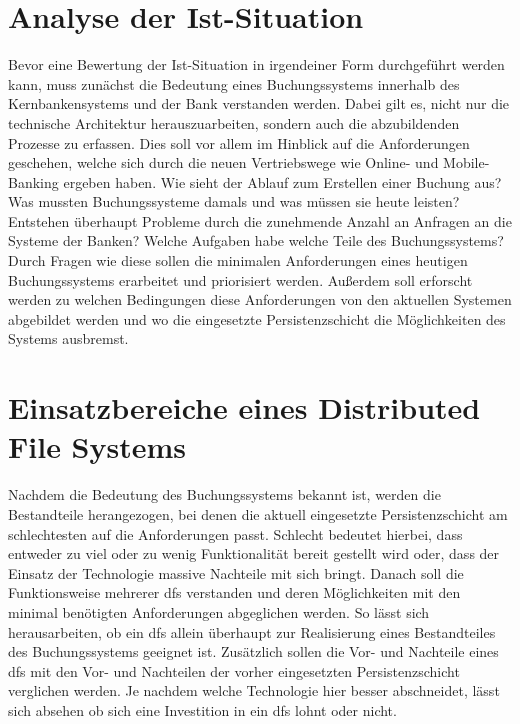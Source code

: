 \documentclass[12pt,oneside,a4paper,parskip]{scrbook}
\begin{document}
\section{Analyse der Ist-Situation}
Bevor eine Bewertung der Ist-Situation in irgendeiner Form durchgeführt werden kann, muss zunächst die Bedeutung eines Buchungssystems innerhalb des Kernbankensystems und der Bank verstanden werden. Dabei gilt es, nicht nur die technische Architektur herauszuarbeiten, sondern auch die abzubildenden Prozesse zu erfassen. Dies soll vor allem im Hinblick auf die Anforderungen geschehen, welche sich durch die neuen Vertriebswege wie Online- und Mobile-Banking ergeben haben. Wie sieht der Ablauf zum Erstellen einer Buchung aus? Was mussten Buchungssysteme damals und was müssen sie heute leisten? Entstehen überhaupt Probleme durch die zunehmende Anzahl an Anfragen an die Systeme der Banken? Welche Aufgaben habe welche Teile des Buchungssystems? Durch Fragen wie diese sollen die minimalen Anforderungen eines heutigen Buchungssystems erarbeitet und priorisiert werden. Außerdem soll erforscht werden zu welchen Bedingungen diese Anforderungen von den aktuellen Systemen abgebildet werden und wo die eingesetzte Persistenzschicht die Möglichkeiten des Systems ausbremst.

\section{Einsatzbereiche eines Distributed File Systems}
Nachdem die Bedeutung des Buchungssystems bekannt ist, werden die Bestandteile herangezogen, bei denen die aktuell eingesetzte Persistenzschicht am schlechtesten auf die Anforderungen passt. Schlecht bedeutet hierbei, dass entweder zu viel oder zu wenig Funktionalität bereit gestellt wird oder, dass der Einsatz der Technologie massive Nachteile mit sich bringt. Danach soll die Funktionsweise mehrerer \ac{dfs} verstanden und deren Möglichkeiten mit den minimal benötigten Anforderungen abgeglichen werden. So lässt sich herausarbeiten, ob ein \ac{dfs} allein überhaupt zur Realisierung eines Bestandteiles des Buchungssystems geeignet ist. Zusätzlich sollen die Vor- und Nachteile eines \ac{dfs} mit den Vor- und Nachteilen der vorher eingesetzten Persistenzschicht verglichen werden. Je nachdem welche Technologie hier besser abschneidet, lässt sich absehen ob sich eine Investition in ein \ac{dfs} lohnt oder nicht.
\end{document}

